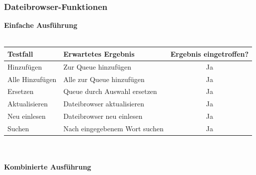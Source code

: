 \subsubsection{Dateibrowser-Funktionen}
\textbf{Einfache Ausführung}\ \\ \\
\begin{tabular}[c]{|p{6cm}|p{6cm}|c|}
\hline
\textbf{Testfall} & \textbf{Erwartetes Ergebnis} & \textbf{Ergebnis eingetroffen?}\\
\hline
Hinzufügen & Zur Queue hinzufügen & Ja\\
\hline
Alle Hinzufügen & Alle zur Queue hinzufügen & Ja\\
\hline
Ersetzen & Queue durch Auswahl ersetzen & Ja\\
\hline
Aktualisieren & Dateibrowser aktualisieren & Ja\\
\hline
Neu einlesen & Dateibrowser neu einlesen & Ja\\
\hline
Suchen & Nach eingegebenem Wort suchen & Ja\\
\hline
\end{tabular}
\ \\ \\
\textbf{Kombinierte Ausführung}\ \\ \\
